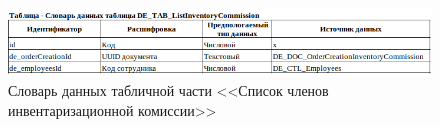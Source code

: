 \begin{figure}[!h]
    \centering
    \includegraphics[width=16cm]
    {assets/InformationalModel/DE_TAB_ListInventoryCommission.png}
    \caption{Словарь данных табличной части <<Список членов инвентаризационной комиссии>>}
    \label{fig:InformationalModel_DE_TAB_ListInventoryCommission}
\end{figure}








